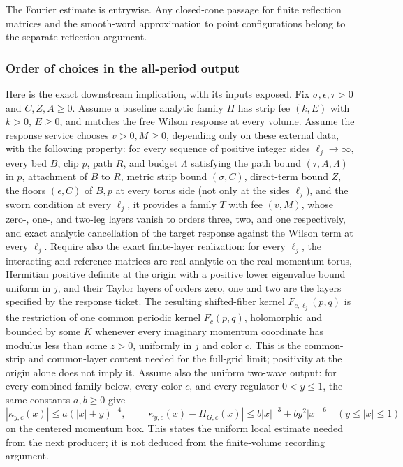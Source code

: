 The Fourier estimate is entrywise. Any closed-cone passage for finite
reflection matrices and the smooth-word approximation to point
configurations belong to the separate reflection argument.

\subsubsection{Order of choices in the all-period output}

Here is the exact downstream implication, with its inputs exposed. Fix
$\sigma,\epsilon,\tau>0$ and $C,Z,A\geq0$. Assume a baseline analytic
family $H$ has strip fee $(k,E)$ with $k>0$, $E\geq0$, and matches the free
Wilson response at every volume. Assume the response service chooses
$v>0,M\geq0$, depending only on these external data, with the following
property: for every sequence of positive integer sides $\ell_j\to\infty$,
every bed $B$, clip $p$, path $R$, and budget $\Lambda$ satisfying the
path bound $(\tau,A,\Lambda)$ in $p$, attachment of $B$ to $R$, metric
strip bound $(\sigma,C)$, direct-term bound $Z$, the floors
$(\epsilon,C)$ of $B,p$ at every torus side (not only at the sides
$\ell_j$), and the sworn condition at every $\ell_j$, it provides a
family $T$ with fee $(v,M)$, whose zero-, one-, and two-leg layers vanish
to orders three, two, and one respectively, and exact analytic
cancellation of the target response against the Wilson term at every
$\ell_j$. Require also the exact finite-layer realization: for every
$\ell_j$, the interacting and reference matrices are real analytic on the
real momentum torus, Hermitian positive definite at the origin with a
positive lower eigenvalue bound uniform in $j$, and their Taylor layers of
orders zero, one and two are the layers specified by the response ticket.
The resulting shifted-fiber kernel $F_{c,\ell_j}(p,q)$ is the restriction
of one common periodic kernel $F_c(p,q)$, holomorphic and bounded by some
$K$ whenever every imaginary momentum coordinate has modulus less than
some $z>0$, uniformly in $j$ and color $c$. This is the common-strip and
common-layer content needed for the full-grid limit; positivity at the
origin alone does not imply it. Assume also the uniform two-wave output: for every
combined family below, every color $c$, and every regulator $0<y\leq1$,
the same constants $a,b\geq0$ give
\begin{equation}
 |\kappa_{y,c}(x)|\leq a(|x|+y)^{-4},\qquad
 |\kappa_{y,c}(x)-\Pi_{G,c}(x)|
      \leq b|x|^{-3}+by^2|x|^{-6}\quad(y\leq|x|\leq1)
 \label{eq:annulus-recording-yield-display-RY9}
\end{equation}
on the centered momentum box. This states the uniform local estimate
needed from the next producer; it is not deduced from the finite-volume
recording argument.

